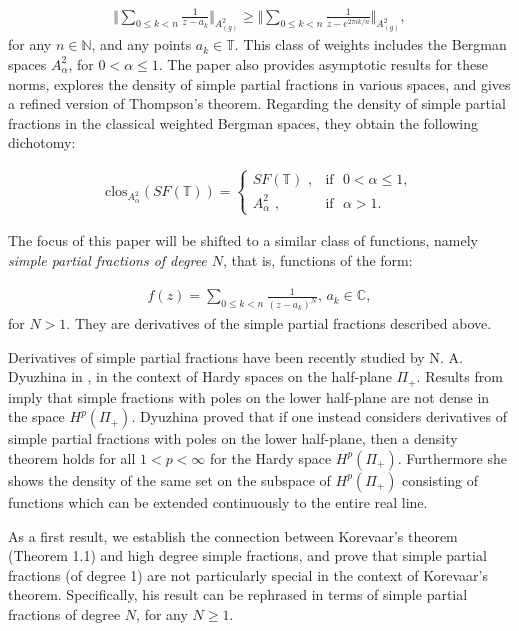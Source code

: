 \documentclass{amsart}[11pt]
\newcommand{\C}{\mathbb{C}} %
\newcommand{\N}{\mathbb{N}} %
\newcommand{\T}{\mathbb{T}} %
\theoremstyle{definition}
\begin{document}
\begin{gather}
\bigg\Vert \sum_{0\leq k < n} \frac{1}{z-a_k} \bigg\Vert_{A^2_{(g)}} \geq \bigg\Vert \sum_{0 \leq k <n} \frac{1}{z-e^{2 \pi i k/n}}\bigg\Vert_{A^2_{(g)}},
\end{gather}
for any $n \in \N$, and any points $a_k \in \T$. This class of weights includes the Bergman spaces $A^2_{\alpha}$, for $0 < \alpha \leq 1$. The paper also provides asymptotic results for these norms, explores the density of simple partial fractions in various spaces, and gives a refined version of Thompson’s theorem. Regarding the density of simple partial fractions in the classical weighted Bergman spaces, they obtain the following dichotomy:

\begin{gather*}
   \text{clos}_{A^2_{\alpha}}(SF(\T)) =
   \begin{cases}
SF(\T)  \,\, ,& \text{if} \,\,\,\, 0 < \alpha \leq 1, \\
A^2_{\alpha}  \,\, ,& \text{if} \,\,\,\, \alpha > 1. 
\end{cases}
\end{gather*}

The focus of this paper will be shifted to a similar class of functions, namely \textit{simple partial fractions of degree $N$}, that is, functions of the form:

\begin{gather*}
   f(z) = \sum_{0 \leq k < n} \frac{1}{(z-a_k)^N}, \, a_k \in \C,
\end{gather*}
for $N > 1$. They are derivatives of the simple partial fractions described above. 

Derivatives of simple partial fractions have been recently studied by N. A. Dyuzhina in \cite{Dyuzhina2021}, in the context of Hardy spaces on the half-plane $\Pi_+$. Results from \cite{Danchenko1995} imply that simple fractions with poles on the lower half-plane are not dense in the space $H^p(\Pi_+)$. Dyuzhina proved that if one instead considers derivatives of simple partial fractions with poles on the lower half-plane, then a density theorem holds for all $1 <p<\infty$ for the Hardy space $H^p(\Pi_+)$. Furthermore she shows the density of the same set on the subspace of $H^p(\Pi_+)$ consisting of functions which can be extended continuously to the entire real line.

As a first result, we establish the connection between Korevaar's theorem (Theorem 1.1) and high degree simple fractions, and prove that simple partial fractions (of degree 1) are not particularly special in the context of Korevaar's theorem. Specifically, his result can be rephrased in terms of simple partial fractions of degree $N$, for any $N\geq 1$.
\end{document}
